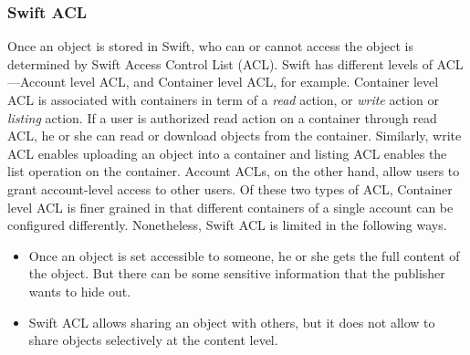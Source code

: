 \subsubsection{Swift ACL}
	Once an object is stored in Swift, who can or cannot access the object is determined by Swift Access Control List (ACL).  Swift has  different levels of ACL---Account level ACL, and Container level ACL, for example. Container level ACL is associated with containers in term of a \emph{read} action, or \emph{write} action  or \emph{listing} action. If a user is authorized read action on a container through read ACL, he or she can read or download objects from the container. Similarly, write ACL enables uploading an object into a container and listing ACL enables the list operation on the container. Account ACLs, on the other hand, allow users to grant account-level access to other users.  Of these two types of ACL, Container level ACL is  finer grained in that different containers of a single account can be configured differently. Nonetheless, Swift ACL is limited in the following ways.
	
\begin{itemize}
	\item  Once an object is set accessible  to someone, he or she gets the full content of the object. But  there can be some sensitive information that the publisher wants to hide out.
		
	 \item  Swift ACL allows  sharing an object with others, but it does not allow to share objects selectively at the content level.
	
\end{itemize}	

